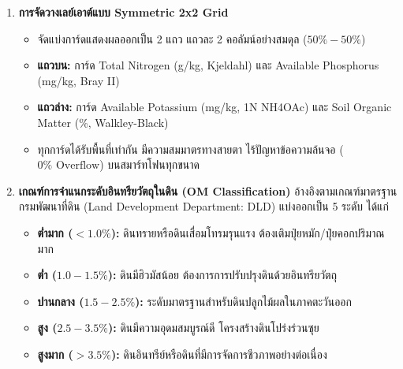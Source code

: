\documentclass[12pt,a4paper,oneside]{book}
\begin{document}
\begin{enumerate}
    \item \textbf{การจัดวางเลย์เอาต์แบบ Symmetric 2x2 Grid}
    \begin{itemize}
        \item จัดแบ่งการ์ดแสดงผลออกเป็น 2 แถว แถวละ 2 คอลัมน์อย่างสมดุล ($50\% - 50\%$)
        \item \textbf{แถวบน:} การ์ด Total Nitrogen (g/kg, Kjeldahl) และ Available Phosphorus (mg/kg, Bray II)
        \item \textbf{แถวล่าง:} การ์ด Available Potassium (mg/kg, 1N NH4OAc) และ Soil Organic Matter (\%, Walkley-Black)
        \item ทุกการ์ดได้รับพื้นที่เท่ากัน มีความสมมาตรทางสายตา ไร้ปัญหาข้อความล้นจอ ($0\%\text{ Overflow}$) บนสมาร์ทโฟนทุกขนาด
    \end{itemize}

    \item \textbf{เกณฑ์การจำแนกระดับอินทรียวัตถุในดิน (OM Classification)}
    อ้างอิงตามเกณฑ์มาตรฐานกรมพัฒนาที่ดิน (Land Development Department: DLD) แบ่งออกเป็น 5 ระดับ ได้แก่
    \begin{itemize}
        \item \textbf{ต่ำมาก ($< 1.0\%$):} ดินทรายหรือดินเสื่อมโทรมรุนแรง ต้องเติมปุ๋ยหมัก/ปุ๋ยคอกปริมาณมาก
        \item \textbf{ต่ำ ($1.0 - 1.5\%$):} ดินมีฮิวมัสน้อย ต้องการการปรับปรุงดินด้วยอินทรียวัตถุ
        \item \textbf{ปานกลาง ($1.5 - 2.5\%$):} ระดับมาตรฐานสำหรับดินปลูกไม้ผลในภาคตะวันออก
        \item \textbf{สูง ($2.5 - 3.5\%$):} ดินมีความอุดมสมบูรณ์ดี โครงสร้างดินโปร่งร่วนซุย
        \item \textbf{สูงมาก ($> 3.5\%$):} ดินอินทรีย์หรือดินที่มีการจัดการชีวภาพอย่างต่อเนื่อง
    \end{itemize}


\end{enumerate}
\end{document}
